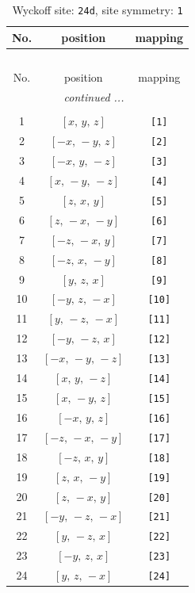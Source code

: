 \documentclass[fleqn,8pt]{jsarticle}
\begin{document}
\begin{longtable}{ccc}
\caption{Wyckoff site: {\tt 24d}, site symmetry: {\tt 1}}
 \\
 \hline \hline
No. & position & mapping \\ \hline \endfirsthead

\multicolumn{2}{l}{\tablename\ \thetable{}} \\
 \hline \hline
No. & position & mapping \\ \hline \endhead

 \hline \hline
\multicolumn{2}{r}{\footnotesize\it continued ...} \\ \endfoot

 \hline \hline
\multicolumn{2}{r}{} \\ \endlastfoot

1 & $\left[ x,\, y,\, z \right]$ & {\tt [1]} \\ \hline
2 & $\left[ - x,\, - y,\, z \right]$ & {\tt [2]} \\ \hline
3 & $\left[ - x,\, y,\, - z \right]$ & {\tt [3]} \\ \hline
4 & $\left[ x,\, - y,\, - z \right]$ & {\tt [4]} \\ \hline
5 & $\left[ z,\, x,\, y \right]$ & {\tt [5]} \\ \hline
6 & $\left[ z,\, - x,\, - y \right]$ & {\tt [6]} \\ \hline
7 & $\left[ - z,\, - x,\, y \right]$ & {\tt [7]} \\ \hline
8 & $\left[ - z,\, x,\, - y \right]$ & {\tt [8]} \\ \hline
9 & $\left[ y,\, z,\, x \right]$ & {\tt [9]} \\ \hline
10 & $\left[ - y,\, z,\, - x \right]$ & {\tt [10]} \\ \hline
11 & $\left[ y,\, - z,\, - x \right]$ & {\tt [11]} \\ \hline
12 & $\left[ - y,\, - z,\, x \right]$ & {\tt [12]} \\ \hline
13 & $\left[ - x,\, - y,\, - z \right]$ & {\tt [13]} \\ \hline
14 & $\left[ x,\, y,\, - z \right]$ & {\tt [14]} \\ \hline
15 & $\left[ x,\, - y,\, z \right]$ & {\tt [15]} \\ \hline
16 & $\left[ - x,\, y,\, z \right]$ & {\tt [16]} \\ \hline
17 & $\left[ - z,\, - x,\, - y \right]$ & {\tt [17]} \\ \hline
18 & $\left[ - z,\, x,\, y \right]$ & {\tt [18]} \\ \hline
19 & $\left[ z,\, x,\, - y \right]$ & {\tt [19]} \\ \hline
20 & $\left[ z,\, - x,\, y \right]$ & {\tt [20]} \\ \hline
21 & $\left[ - y,\, - z,\, - x \right]$ & {\tt [21]} \\ \hline
22 & $\left[ y,\, - z,\, x \right]$ & {\tt [22]} \\ \hline
23 & $\left[ - y,\, z,\, x \right]$ & {\tt [23]} \\ \hline
24 & $\left[ y,\, z,\, - x \right]$ & {\tt [24]} \\
\end{longtable}
\end{document}

